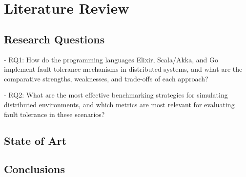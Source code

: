 % 
\chapter{Literature Review} %

%
\section{Research Questions} 

- RQ1: How do the programming languages Elixir, Scala/Akka, and Go implement fault-tolerance mechanisms in distributed systems, and what are the comparative strengths, weaknesses, and trade-offs of each approach?

- RQ2: What are the most effective benchmarking strategies for simulating distributed environments, and which metrics are most relevant for evaluating fault tolerance in these scenarios?

\section{State of Art}



\section{Conclusions}